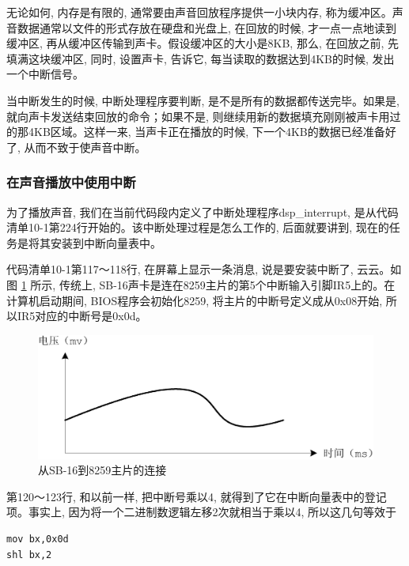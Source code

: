 \documentclass[12pt]{article}
\begin{document}
\begin{CJK}{UTF8}{gbsn}
无论如何, 内存是有限的, 通常要由声音回放程序提供一小块内存, 称为缓冲区。声音数据通常以文件的形式存放在硬盘和光盘上, 在回放的时候, 才一点一点地读到缓冲区, 再从缓冲区传输到声卡。假设缓冲区的大小是8KB, 那么, 在回放之前, 先填满这块缓冲区, 同时, 设置声卡, 告诉它, 每当读取的数据达到4KB的时候, 发出一个中断信号。

当中断发生的时候, 中断处理程序要判断, 是不是所有的数据都传送完毕。如果是, 就向声卡发送结束回放的命令；如果不是, 则继续用新的数据填充刚刚被声卡用过的那4KB区域。这样一来, 当声卡正在播放的时候, 下一个4KB的数据已经准备好了, 从而不致于使声音中断。

\subsubsection{在声音播放中使用中断}
为了播放声音, 我们在当前代码段内定义了中断处理程序dsp\_{}interrupt, 是从代码清单10-1第224行开始的。该中断处理过程是怎么工作的, 后面就要讲到, 现在的任务是将其安装到中断向量表中。

代码清单10-1第117～118行, 在屏幕上显示一条消息, 说是要安装中断了, 云云。如图 \ref{sb16-8259} 所示, 传统上, SB-16声卡是连在8259主片的第5个中断输入引脚IR5上的。在计算机启动期间, BIOS程序会初始化8259, 将主片的中断号定义成从0x08开始, 所以IR5对应的中断号是0x0d。

\begin{figure}
\begin{center}
\includegraphics[width=\textwidth]{eps/10-4.bmp.eps}
\caption{从SB-16到8259主片的连接}\label{sb16-8259}
\end{center}
\end{figure}

第120～123行, 和以前一样, 把中断号乘以4, 就得到了它在中断向量表中的登记项。事实上, 因为将一个二进制数逻辑左移2次就相当于乘以4, 所以这几句等效于

\begin{verbatim}
mov bx,0x0d
shl bx,2
\end{verbatim}


\end{CJK}
\end{document}
